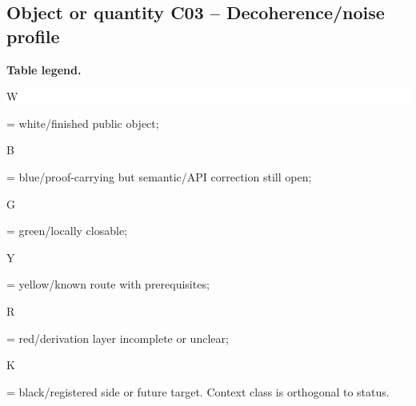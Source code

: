 \subsection*{Object or quantity C03 -- Decoherence/\allowbreak{}noise profile}
\hypertarget{objproof:C03}{}
\par\smallskip\noindent\begin{minipage}{0.99\linewidth}\footnotesize\raggedright\textbf{Table legend.} \colorbox{white}{\strut W} = white/finished public object; \colorbox{cyan!20}{\strut B} = blue/proof-carrying but semantic/API correction still open; \colorbox{green!18}{\strut G} = green/locally closable; \colorbox{yellow!25}{\strut Y} = yellow/known route with prerequisites; \colorbox{red!20}{\strut R} = red/derivation layer incomplete or unclear; \colorbox{black!18}{\strut K} = black/registered side or future target. Context class is orthogonal to status.\end{minipage}\par\vspace{0.25em}
